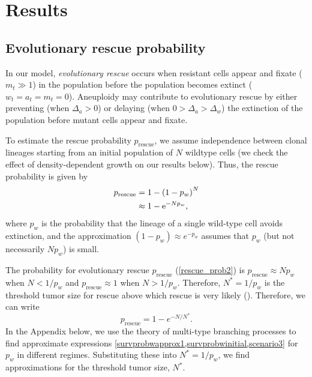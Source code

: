 \documentclass[12pt]{extarticle}
\newcommand{\e}{{\rm e}}
\newcommand{\presc}{p_\text{rescue}}
\begin{document}

\section*{Results}


\subsection*{Evolutionary rescue probability}

In our model, \emph{evolutionary rescue} occurs when resistant cells appear and fixate ($m_t \gg 1$) in the population before the population becomes extinct ($w_t=a_t=m_t=0$).
Aneuploidy may contribute to evolutionary rescue by either preventing (when $\Delta_a>0$) or delaying (when $0>\Delta_a>\Delta_w$) the extinction of the population before mutant cells appear and fixate.

To estimate the rescue probability $\presc$, we assume independence between clonal lineages starting from an initial population of $N$ wildtype cells (we check the effect of density-dependent growth on our results below).
Thus, the rescue probability is given by 
\begin{subequations}
\begin{align}
\presc &= 1-\left(1-p_w\right)^N \label{rescue_prob} \\
& \approx 1-\e^{-Np_w} , \label{rescue_prob2}
\end{align}
\end{subequations}
where $p_w$ is the probability that the lineage of a single wild-type cell avoids extinction, and the approximation $(1-p_w)\approx e^{-p_w}$ assumes that $p_w$ (but not necessarily $N p_w$) is small.

The probability for evolutionary rescue $\presc$  (\cref{rescue_prob2}) is $\presc \approx N p_w$ when $N<1/p_w$ and $\presc \approx 1$ when $N > 1/p_w$. Therefore, $N^*=1/p_w$ is the threshold tumor size for rescue above which rescue is very likely (). %
Therefore, we can write
\begin{equation}
\presc = 1-e^{-N/N^*} .
\end{equation}
In the Appendix below, we use the theory of multi-type branching processes to find approximate expressions \cref{survprobwapprox1,survprobwinitial,scenario3} for $p_w$ in different regimes. 
Substituting these  into $N^*=1/p_w$, we find approximations for the threshold tumor size, $N^*$. 
\\
\end{document}
